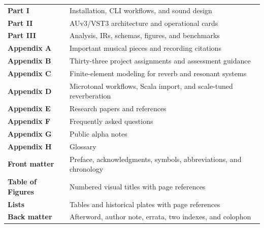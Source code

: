 {  \vspace{0.25in}
  \begin{center}
    \begin{tabular}{@{}ll@{}}
      \textbf{Part I} & Installation, CLI workflows, and sound design\\
      \textbf{Part II} & AUv3/VST3 architecture and operational cards\\
      \textbf{Part III} & Analysis, IRs, schemas, figures, and benchmarks\\
      \textbf{Appendix A} & Important musical pieces and recording citations\\
      \textbf{Appendix B} & Thirty-three project assignments and assessment guidance\\
      \textbf{Appendix C} & Finite-element modeling for reverb and resonant systems\\
      \textbf{Appendix D} & Microtonal workflows, Scala import, and scale-tuned reverberation\\
      \textbf{Appendix E} & Research papers and references\\
      \textbf{Appendix F} & Frequently asked questions\\
      \textbf{Appendix G} & Public alpha notes\\
      \textbf{Appendix H} & Glossary\\
      \textbf{Front matter} & Preface, acknowledgments, symbols, abbreviations, and chronology\\
      \textbf{Table of Figures} & Numbered visual titles with page references\\
      \textbf{Lists} & Tables and historical plates with page references\\
      \textbf{Back matter} & Afterword, author note, errata, two indexes, and colophon
    \end{tabular}
  \end{center}
  \clearpage
  \verbxSymbols
  \verbxAbbreviations
  \verbxChronology
  \verbxBibliographicalNote
}

